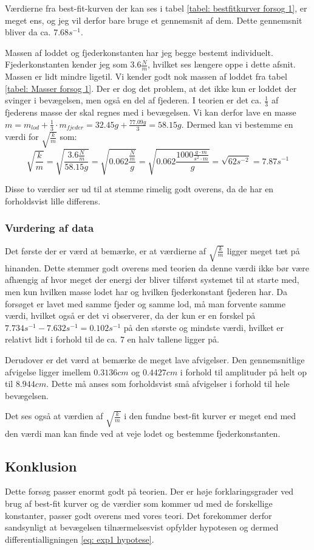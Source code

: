 Værdierne fra best-fit-kurven der kan ses i tabel \ref{tabel: bestfitkurver forsog 1}, er meget ens, og jeg vil derfor bare bruge et gennemsnit af dem. 
Dette gennemsnit bliver da ca. $7.68s^{-1}$.

Massen af loddet og fjederkonstanten har jeg begge bestemt individuelt. 
Fjederkonstanten kender jeg som $3.6\frac{N}{m}$, hvilket ses længere oppe i dette afsnit. 
Massen er lidt mindre ligetil. 
Vi kender godt nok massen af loddet fra tabel \ref{tabel: Masser forsog 1}. 
Der er dog det problem, at det ikke kun er loddet der svinger i bevægelsen, men også en del af fjederen. 
I teorien er det ca. $\frac{1}{3}$ af fjederens masse der skal regnes med i bevægelsen.
Vi kan derfor lave en masse $m=m_{lod}+\frac{1}{3}\cdot m_{fjeder}=32.45g+\frac{77.09g}{3}=58.15g$. 
Dermed kan vi bestemme en værdi for $\sqrt{\frac{k}{m}}$ som:
$$\sqrt{\frac{k}{m}}=\sqrt{\frac{3.6\frac{N}{m}}{58.15g}}=\sqrt{0.062\frac{\frac{N}{m}}{g}}=\sqrt{0.062\frac{1000\frac{g\cdot m}{s^2\cdot m}}{g}}=\sqrt{62s^{-2}}=7.87s^{-1}$$

Disse to værdier ser ud til at stemme rimelig godt overens, da de har en forholdsvist lille differens. 



\subsubsection{Vurdering af data}\label{exp1: Vurdering af data}
Det første der er værd at bemærke, er at værdierne af $\sqrt{\frac{k}{m}}$ ligger meget tæt på hinanden. 
Dette stemmer godt overens med teorien da denne værdi ikke bør være afhængig af hvor meget der energi der bliver tilførst systemet til at starte med, men kun hvilken masse lodet har og hvilken fjederkonstant fjederen har. 
Da forsøget er lavet med samme fjeder og samme lod, må man forvente samme værdi, hvilket også er det vi observerer, da der kun er en forskel på $7.734s^{-1}-7.632s^{-1}=0.102s^{-1}$ på den største og mindste værdi, hvilket er relativt lidt i forhold til de ca. 7 en halv tallene ligger på.



Derudover er det værd at bemærke de meget lave afvigelser. 
Den gennemsnitlige afvigelse ligger imellem $0.3136cm$ og $0.4427cm$ i forhold til amplituder på helt op til $8.944cm$. 
Dette må anses som forholdsvist små afvigelser i forhold til hele bevægelsen.

Det ses også at værdien af $\sqrt{\frac{k}{m}}$ i den fundne best-fit kurver er meget end med den værdi man kan finde ved at veje lodet og bestemme fjederkonstanten. 

\subsection{Konklusion}
Dette forsøg passer enormt godt på teorien. 
Der er høje forklaringsgrader ved brug af best-fit kurver og de værdier som kommer ud med de forskellige konstanter, passer godt overens med vores teori.
Det forekommer derfor sandsynligt at bevægelsen tilnærmelsesvist opfylder hypotesen og dermed differentialligningen \ref{eq: exp1 hypotese}.

